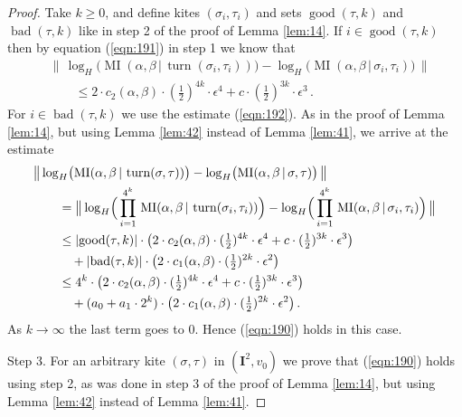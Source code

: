 \documentclass[10pt, a4paper]{amsart}
\theoremstyle{definition}
\numberwithin{equation}{section}
\newcommand{\opn}{\operatorname}
\newcommand{\mbf}[1]{\mathbf{#1}}
\newcommand{\smfrac}[2]{{\textstyle \frac{#1}{#2}}}
\newcommand{\Norm}[1]{\bigl\lVert\, #1 \, \bigr\rVert}
\newcommand{\abs}[1]{\lvert #1 \rvert}
\renewcommand{\vert}{\, | \,}
\begin{document}
\begin{proof}
Take $k \geq 0$, and define kites $(\sigma_i, \tau_i)$ and  sets
$\opn{good}(\tau, k)$
and $\opn{bad}(\tau, k)$ like in step 2 of the proof of Lemma \ref{lem:14}.
If $i \in \opn{good}(\tau, k)$ then by equation (\ref{eqn:191}) in step 1 we
know
that 
\[ \begin{aligned}
& \Norm{ \log_H \bigl(  \opn{MI}(\alpha, \beta \vert 
\opn{turn}(\sigma_i, \tau_i)) \bigr) -
\log_H \bigl(  \opn{MI}(\alpha, \beta \vert \sigma_i, \tau_i) \bigr) } \\
& \qquad \leq  2 \cdot c_2(\alpha, \beta) \cdot (\smfrac{1}{2})^{4 k} \cdot
\epsilon^4 + 
c \cdot (\smfrac{1}{2})^{3 k} \cdot \epsilon^3 \, .
\end{aligned} \]
For $i \in \opn{bad}(\tau, k)$ we use the estimate (\ref{eqn:192}). 
As in the proof of Lemma \ref{lem:14}, but using Lemma \ref{lem:42} instead of
Lemma \ref{lem:41}, we arrive at the estimate
\[ \begin{aligned}
& \Norm{ \log_H \bigl( 
\opn{MI} ( \alpha, \beta \vert \opn{turn}(\sigma, \tau) ) \bigr) -
\log_H \bigl( 
\opn{MI} ( \alpha, \beta \vert \sigma, \tau) \bigr) } \\
& \qquad = \Norm{ \log_H \Bigl( \,
\prod_{i = 1}^{4^k} \, 
\opn{MI} ( \alpha, \beta \vert \opn{turn}(\sigma_i, \tau_i) ) \Bigr) -
\log_H \Bigl( \,
\prod_{i = 1}^{4^k} \, 
\opn{MI} ( \alpha, \beta \vert \sigma_i, \tau_i) \Bigr) } \\
& \qquad \leq 
\abs{ \opn{good}(\tau, k) } \cdot 
\bigl( 2 \cdot c_2(\alpha, \beta) \cdot (\smfrac{1}{2})^{4 k} \cdot
\epsilon^4 + c \cdot (\smfrac{1}{2})^{3 k} \cdot \epsilon^3 \bigr) \\
& \qquad \quad +
\abs{ \opn{bad}(\tau, k) } \cdot \bigl( 2 \cdot  c_1(\alpha, \beta) \cdot
(\smfrac{1}{2})^{2 k} \cdot \epsilon^2 \bigr) \\
& \qquad \leq 
4^k \cdot \bigl( 2 \cdot c_2(\alpha, \beta) \cdot (\smfrac{1}{2})^{4 k} \cdot
\epsilon^4 + c \cdot (\smfrac{1}{2})^{3 k} \cdot \epsilon^3 \bigr) \\
& \qquad \quad + 
(a_0 + a_1 \cdot 2^k) \cdot 
\bigl( 2 \cdot  c_1(\alpha, \beta) \cdot
(\smfrac{1}{2})^{2 k} \cdot \epsilon^2 \bigr) \, . 
\end{aligned} \]
As $k \to \infty$ the last term goes to $0$. Hence (\ref{eqn:190}) holds in
this case.

\medskip \noindent
Step 3. For an arbitrary kite $(\sigma, \tau)$ in $(\mbf{I}^2, v_0)$ we prove
that (\ref{eqn:190}) holds using step 2, as was done in step 3 of the proof of  
Lemma \ref{lem:14}, but using Lemma \ref{lem:42} instead of Lemma \ref{lem:41}.
\end{proof}
\end{document}
